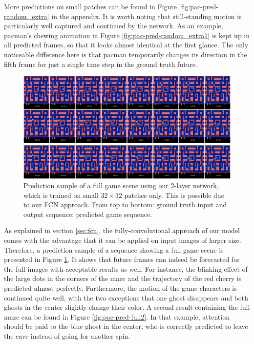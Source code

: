 More predictions on small patches can be found in Figure \ref{fig:pac-pred-random_extra} in the appendix. It is worth noting that still-standing motion is particularly well captured and continued by the network. As an example, pacman's chewing animation in Figure \ref{fig:pac-pred-random_extra1} is kept up in all predicted frames, so that it looks almost identical at the first glance. The only noticeable difference here is that pacman temporarily changes its direction in the fifth frame for just a single time step in the ground truth future.

\begin{figure}[htpb]
	\centering
	\includegraphics[width=1.0\linewidth]{figures/pred/pac/full/pred-00.png} 
	\caption[Random Full Screen Prediction Sample on MsPacman]{Prediction sample of a full game scene using our 2-layer network, which is trained on small $32 \times 32$ patches only. This is possible due to our FCN approach. From top to bottom: ground truth input and output sequence; predicted game sequence.} \label{fig:pac-pred-full1}
\end{figure}

As explained in section \ref{sec:fcn}, the fully-convolutional approach of our model comes with the advantage that it can be applied on input images of larger size. Therefore, a prediction sample of a sequence showing a full game scene is presented in Figure \ref{fig:pac-pred-full1}. It shows that future frames can indeed be forecasted for the full images with acceptable results as well. For instance, the blinking effect of the large dots in the corners of the maze and the trajectory of the red cherry is predicted almost perfectly. Furthermore, the motion of the game characters is continued quite well, with the two exceptions that one ghost disappears and both ghosts in the center slightly change their color. A second result containing the full maze can be found in Figure \ref{fig:pac-pred-full2}. In that example, attention should be paid to the blue ghost in the center, who is correctly predicted to leave the cave instead of going for another spin.

